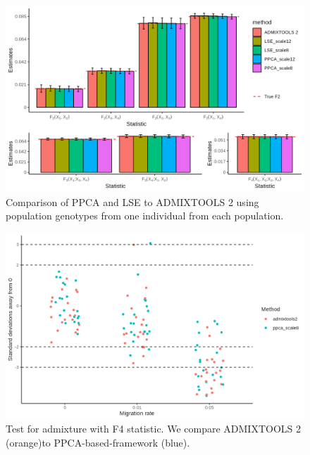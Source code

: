 \documentclass[12pt, letterpaper]{article}
\begin{document}
\begin{figure}[ht!]
    \includegraphics[width=16.5cm]{plots/simfiles/Ne1000/split_times1000/npop10_nind100/plots_8_12/mu0.05_plot_all_1ind.png}
    \centering
    \caption{Comparison of PPCA and LSE to ADMIXTOOLS 2 using population genotypes from one individual from each population.}
    \label{figS2:pc_scale}
\end{figure}

\begin{figure}[ht!]
    \includegraphics[width=16.5cm]{plots/simfiles/AvgFolder/Ne1000/split_times1000/npop10_nind100/missing0/plots_8/hypothesis_test_comparison.png}
    \centering
    \caption{Test for admixture with F4 statistic. We compare ADMIXTOOLS 2 (orange)to PPCA-based-framework (blue).}
    \label{figS2:pc_scale}
\end{figure}
\end{document}
